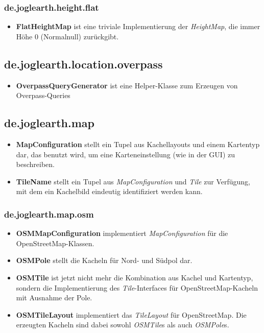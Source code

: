 \documentclass[10pt]{scrreprt}
\begin{document}
\subsubsection*{de.joglearth.height.flat}
\begin{itemize}
\item \textbf{FlatHeightMap} ist eine triviale Implementierung der \textit{HeightMap}, die immer Höhe 0 (Normalnull) zurückgibt.
\end{itemize}

\subsection*{de.joglearth.location.overpass}
\begin{itemize}
\item \textbf{OverpassQueryGenerator} ist eine Helper-Klasse zum Erzeugen von Overpass-Queries
\end{itemize}

\subsection*{de.joglearth.map}
\begin{itemize}
\item \textbf{MapConfiguration} stellt ein Tupel aus Kachellayouts und einem Kartentyp dar, das benutzt wird, um eine Karteneinstellung (wie in der GUI) zu beschreiben.
\item \textbf{TileName} stellt ein Tupel aus \textit{MapConfiguration} und \textit{Tile} zur Verfügung, mit dem ein Kachelbild eindeutig identifiziert werden kann.
\end{itemize}

\subsubsection*{de.joglearth.map.osm}
\begin{itemize}
\item \textbf{OSMMapConfiguration} implementiert \textit{MapConfiguration} für die OpenStreetMap-Klassen.
\item \textbf{OSMPole} stellt die Kacheln für Nord- und Südpol dar.
\item \textbf{OSMTile} ist jetzt nicht mehr die Kombination aus Kachel und Kartentyp, sondern die Implementierung des \textit{Tile}-Interfaces für OpenStreetMap-Kacheln mit Ausnahme der Pole.
\item \textbf{OSMTileLayout} implementiert das \textit{TileLayout} für OpenStreetMap. Die erzeugten Kacheln sind dabei sowohl \textit{OSMTile}s als auch \textit{OSMPole}s.
\end{itemize}
\end{document}
